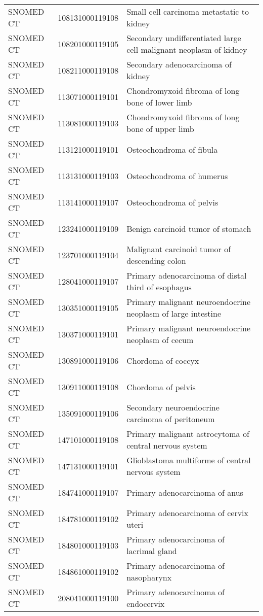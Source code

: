 \begin{longtable}{p{}p{}p{}}
  SNOMED CT & 108131000119108 & Small cell carcinoma metastatic to kidney \\ 
  SNOMED CT & 108201000119105 & Secondary undifferentiated large cell malignant neoplasm of kidney \\ 
  SNOMED CT & 108211000119108 & Secondary adenocarcinoma of kidney \\ 
  SNOMED CT & 113071000119101 & Chondromyxoid fibroma of long bone of lower limb \\ 
  SNOMED CT & 113081000119103 & Chondromyxoid fibroma of long bone of upper limb \\ 
  SNOMED CT & 113121000119101 & Osteochondroma of fibula \\ 
  SNOMED CT & 113131000119103 & Osteochondroma of humerus \\ 
  SNOMED CT & 113141000119107 & Osteochondroma of pelvis \\ 
  SNOMED CT & 123241000119109 & Benign carcinoid tumor of stomach \\ 
  SNOMED CT & 123701000119104 & Malignant carcinoid tumor of descending colon \\ 
  SNOMED CT & 128041000119107 & Primary adenocarcinoma of distal third of esophagus \\ 
  SNOMED CT & 130351000119105 & Primary malignant neuroendocrine neoplasm of large intestine \\ 
  SNOMED CT & 130371000119101 & Primary malignant neuroendocrine neoplasm of cecum \\ 
  SNOMED CT & 130891000119106 & Chordoma of coccyx \\ 
  SNOMED CT & 130911000119108 & Chordoma of pelvis \\ 
  SNOMED CT & 135091000119106 & Secondary neuroendocrine carcinoma of peritoneum \\ 
  SNOMED CT & 147101000119108 & Primary malignant astrocytoma of central nervous system \\ 
  SNOMED CT & 147131000119101 & Glioblastoma multiforme of central nervous system \\ 
  SNOMED CT & 184741000119107 & Primary adenocarcinoma of anus \\ 
  SNOMED CT & 184781000119102 & Primary adenocarcinoma of cervix uteri \\ 
  SNOMED CT & 184801000119103 & Primary adenocarcinoma of lacrimal gland \\ 
  SNOMED CT & 184861000119102 & Primary adenocarcinoma of nasopharynx \\ 
  SNOMED CT & 208041000119100 & Primary adenocarcinoma of endocervix \\ 

\end{longtable}

